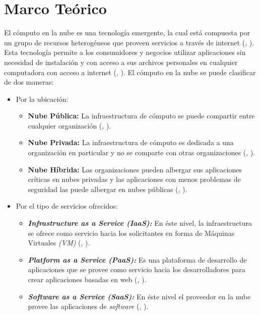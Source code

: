 \documentclass[jou,apacite]{apa6}
\begin{document}
\section{Marco Teórico}

El c\'omputo en la nube es una tecnolog\'ia emergente, la cual est\'a compuesta por un grupo de recursos heterog\'eneos que proveen servicios a trav\'es de internet (\citeauthor{agarwal2014efficient}, \citeyear{agarwal2014efficient}).
Esta tecnolog\'ia permite a los consumidores y negocios utilizar aplicaciones sin necesidad de instalaci\'on y con acceso a sus archivos personales en cualquier computadora con acceso a internet (\citeauthor{ahmed2012advanced}, \citeyear{ahmed2012advanced}). 
El c\'omputo en la nube se puede clasificar de dos maneras:
\begin{itemize}
	\item Por la ubicaci\'on: 
	\begin{itemize}
		\item \textbf{Nube P\'ublica:} La infraestructura de c\'omputo se puede compartir entre cualquier organizaci\'on (\citeauthor{ahmed2012advanced}, \citeyear{ahmed2012advanced}).
		\item \textbf{Nube Privada:} La infraestructura de c\'omputo es dedicada a una organizaci\'on en particular y no se comparte con otras organizaciones (\citeauthor{ahmed2012advanced}, \citeyear{ahmed2012advanced}).
		\item \textbf{Nube H\'ibrida:} Las organizaciones pueden albergar sus aplicaciones cr\'iticas en nubes privadas y las aplicaciones con menos problemas de seguridad las puede albergar en nubes p\'ublicas (\citeauthor{ahmed2012advanced}, \citeyear{ahmed2012advanced}).
	\end{itemize}
	\item Por el tipo de servicios ofrecidos: 
	\begin{itemize}
		\item \textit{\textbf{Infrastructure as a Service (IaaS):}} En \'este nivel, la infraestructura se ofrece como servicio hacia los solicitantes en forma de M\'aquinas Virtuales \textit{(VM)} (\citeauthor{agarwal2014efficient}, \citeyear{agarwal2014efficient}).
		\item \textit{\textbf{Platform as a Service (PaaS):}} Es una plataforma de desarrollo de aplicaciones que se provee como servicio hacia los desarrolladores para crear aplicaciones basadas en web (\citeauthor{agarwal2014efficient}, \citeyear{agarwal2014efficient}).
		\item \textit{\textbf{Software as a Service (SaaS):}} En \'este nivel el proveedor en la nube provee las aplicaciones de \textit{software} (\citeauthor{agarwal2014efficient}, \citeyear{agarwal2014efficient}).
	\end{itemize}
\end{itemize}
\end{document}
